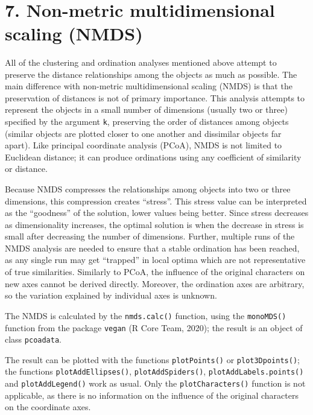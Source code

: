 \documentclass[
]{article}
\begin{document}
~

\newpage

\hypertarget{non-metric-multidimensional-scaling-nmds}{%
\section{7. Non-metric multidimensional scaling
(NMDS)}\label{non-metric-multidimensional-scaling-nmds}}

All of the clustering and ordination analyses mentioned above attempt to
preserve the distance relationships among the objects as much as
possible. The main difference with non-metric multidimensional scaling
(NMDS) is that the preservation of distances is not of primary
importance. This analysis attempts to represent the objects in a small
number of dimensions (usually two or three) specified by the argument
\texttt{k}, preserving the order of distances among objects (similar
objects are plotted closer to one another and dissimilar objects far
apart). Like principal coordinate analysis (PCoA), NMDS is not limited
to Euclidean distance; it can produce ordinations using any coefficient
of similarity or distance.

Because NMDS compresses the relationships among objects into two or
three dimensions, this compression creates ``stress''. This stress value
can be interpreted as the ``goodness'' of the solution, lower values
being better. Since stress decreases as dimensionality increases, the
optimal solution is when the decrease in stress is small after
decreasing the number of dimensions. Further, multiple runs of the NMDS
analysis are needed to ensure that a stable ordination has been reached,
as any single run may get ``trapped'' in local optima which are not
representative of true similarities. Similarly to PCoA, the influence of
the original characters on new axes cannot be derived directly.
Moreover, the ordination axes are arbitrary, so the variation explained
by individual axes is unknown.

The NMDS is calculated by the \texttt{nmds.calc()} function, using the
\texttt{monoMDS()} function from the package \texttt{vegan} (R Core
Team, 2020); the result is an object of class \texttt{pcoadata}.

The result can be plotted with the functions \texttt{plotPoints()} or
\texttt{plot3Dpoints()}; the functions \texttt{plotAddEllipses()},
\texttt{plotAddSpiders()}, \texttt{plotAddLabels.points()} and
\texttt{plotAddLegend()} work as usual. Only the
\texttt{plotCharacters()} function is not applicable, as there is no
information on the influence of the original characters on the
coordinate axes.
\end{document}
